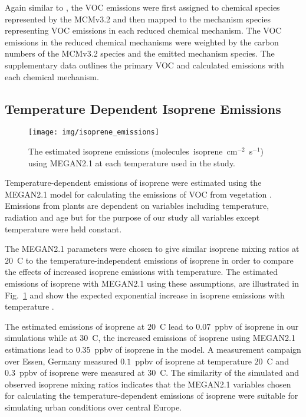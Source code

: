 Again similar to \citet{vonSchneidemesser:2015}, the VOC emissions were first assigned to chemical species represented by the MCMv3.2 and then mapped to the mechanism species representing VOC emissions in each reduced chemical mechanism.
The VOC emissions in the reduced chemical mechanisms were weighted by the carbon numbers of the MCMv3.2 species and the emitted mechanism species. 
The supplementary data outlines the primary VOC and calculated emissions with each chemical mechanism.

\subsection{Temperature Dependent Isoprene Emissions} \label{ss:megan}
\begin{figure}[t]%
    \centering%
    \caption{The estimated isoprene emissions (molecules~isoprene~cm$^{-2}$~s$^{-1}$) using MEGAN2.1 at each temperature used in the study.}
    \label{f:isoprene_emissions}%
    \texttt{[image: img/isoprene\_emissions]}
\end{figure}
Temperature-dependent emissions of isoprene were estimated using the MEGAN2.1 model for calculating the emissions of VOC from vegetation \citep{Guenther:2012}.
Emissions from plants are dependent on variables including temperature, radiation and age but for the purpose of our study all variables except temperature were held constant.

The MEGAN2.1 parameters were chosen to give similar isoprene mixing ratios at $20$~\degree C to the temperature-independent emissions of isoprene in order to compare the effects of increased isoprene emissions with temperature.
The estimated emissions of isoprene with MEGAN2.1 using these assumptions, are illustrated in Fig.~\ref{f:isoprene_emissions} and show the expected exponential increase in isoprene emissions with temperature \citep{Guenther:2006}.

The estimated emissions of isoprene at $20$~\degree C lead to $0.07$~ppbv of isoprene in our simulations while at $30$~\degree C, the increased emissions of isoprene using MEGAN2.1 estimations lead to $0.35$~ppbv of isoprene in the model.
A measurement campaign over Essen, Germany \citep{Wagner:2014} measured $0.1$~ppbv of isoprene at temperature $20$~\degree C and $0.3$~ppbv of isoprene were measured at $30$~\degree C.
The similarity of the simulated and observed isoprene mixing ratios indicates that the MEGAN2.1 variables chosen for calculating the temperature-dependent emissions of isoprene were suitable for simulating urban conditions over central Europe.
